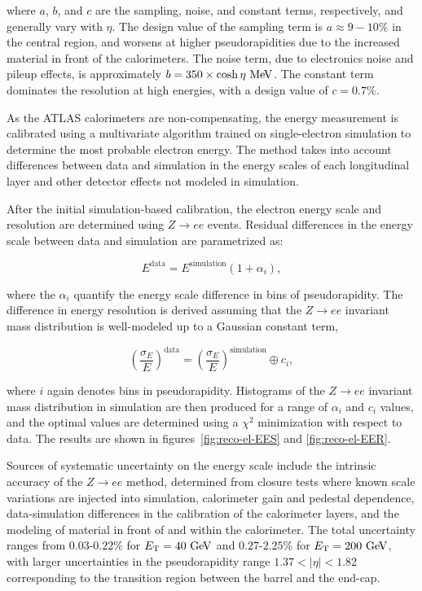 where $a$, $b$, and $c$ are the sampling, noise, and constant terms, respectively, and generally vary with $\eta$. The design value of the sampling term is $a\approx 9-10\%$ in the central region, and worsens at higher pseudorapidities due to the increased material in front of the calorimeters. The noise term, due to electronics noise and pileup effects, is approximately $b = 350 \times \cosh\eta \MeV$. The constant term dominates the resolution at high energies, with a design value of $c=0.7\%$. 

As the ATLAS calorimeters are non-compensating, the energy measurement is calibrated using a multivariate algorithm trained on single-electron simulation to determine the most probable electron energy. The method takes into account differences between data and simulation in the energy scales of each longitudinal layer and other detector effects not modeled in simulation. 

After the initial simulation-based calibration, the electron energy scale and resolution are determined using $Z\rightarrow ee$ events. Residual differences in the energy scale between data and simulation are parametrized as:

\begin{equation}
	E^{\mathrm{data}} = E^{\mathrm{simulation}} (1 + \alpha_i),
\end{equation}

where the $\alpha_i$ quantify the energy scale difference in bins of pseudorapidity. The difference in energy resolution is derived assuming that the $Z\rightarrow ee$ invariant mass distribution is well-modeled up to a Gaussian constant term, 

\begin{equation}
	\left(\frac{\sigma_E}{E}\right)^{\mathrm{data}} = \left(\frac{\sigma_E}{E}\right)^{\mathrm{simulation}} \oplus c_i,
\end{equation}

where $i$ again denotes bins in pseudorapidity. Histograms of the $Z\rightarrow ee$ invariant mass distribution in simulation are then produced for a range of $\alpha_i$ and $c_i$ values, and the optimal values are determined using a $\chi^2$ minimization with respect to data. The results are shown in figures~\ref{fig:reco-el-EES} and \ref{fig:reco-el-EER}. 

Sources of systematic uncertainty on the energy scale include the intrinsic accuracy of the $Z\rightarrow ee$ method, determined from closure tests where known scale variations are injected into simulation, calorimeter gain and pedestal dependence, data-simulation differences in the calibration of the calorimeter layers, and the modeling of material in front of and within the calorimeter. The total uncertainty ranges from $0.03$-$0.22$\% for $\Et=40 \GeV$ and $0.27$-$2.25$\% for $\Et = 200 \GeV$, with larger uncertainties in the pseudorapidity range $1.37<|\eta|<1.82$ corresponding to the transition region between the barrel and the end-cap. 


